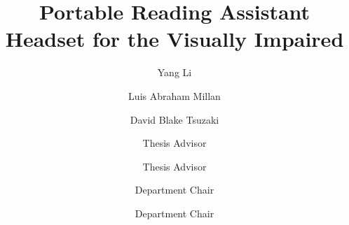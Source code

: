 \documentclass{scu-thesis}
\author{Yang Li}
\author{Luis Abraham Millan}
\author{David Blake Tsuzaki}
\title{Portable Reading Assistant Headset for the Visually Impaired}
\begin{document}
\frontmatter
\signature{Thesis Advisor}
\signature{Thesis Advisor}
\signature{Department Chair}
\signature{Department Chair}

\maketitle


\tableofcontents
\listoffigures
\listoftables

\mainmatter




%





%

\backmatter

\end{document}
